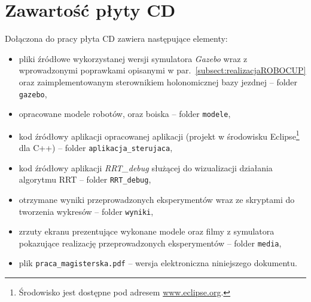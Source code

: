 \appendix
\chapter[Zawartość płyty CD ]{Zawartość płyty CD}
Dołączona do pracy płyta CD zawiera następujące elementy:
\begin{itemize}
\item pliki źródłowe wykorzystanej wersji symulatora \textit{Gazebo} wraz z wprowadzonymi poprawkami opisanymi w par.~\ref{subsect:realizacjaROBOCUP} oraz zaimplementowanym
sterownikiem holonomicznej bazy jezdnej -- folder \texttt{gazebo},
\item opracowane modele robotów, oraz boiska  -- folder \texttt{modele},
\item kod źródłowy aplikacji opracowanej aplikacji (projekt w środowisku \mbox{Eclipse}\footnote{Środowisko jest dostępne pod adresem \url{www.eclipse.org}.} dla C++) -- folder \texttt{aplikacja\_sterujaca},
\item kod źródłowy  aplikacji \textit{RRT\_debug} służącej do wizualizacji działania algorytmu RRT -- folder \texttt{RRT\_debug}, 
\item otrzymane wyniki przeprowadzonych eksperymentów wraz ze skryptami do tworzenia wykresów -- folder \texttt{wyniki},
\item zrzuty ekranu prezentujące wykonane modele oraz filmy z symulatora pokazujące realizację przeprowadzonych eksperymentów -- folder \texttt{media},
\item plik \texttt{praca\_magisterska.pdf} -- wersja elektroniczna niniejszego dokumentu.
\end{itemize}


